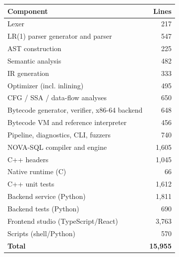 \begin{tabular}{@{}lr@{}}\toprule
\textbf{Component} & \textbf{Lines}\\ \midrule
Lexer & 217\\
LR(1) parser generator and parser & 547\\
AST construction & 225\\
Semantic analysis & 482\\
IR generation & 333\\
Optimizer (incl. inlining) & 495\\
CFG / SSA / data-flow analyses & 650\\
Bytecode generator{,} verifier{,} x86-64 backend & 648\\
Bytecode VM and reference interpreter & 456\\
Pipeline{,} diagnostics{,} CLI{,} fuzzers & 740\\
NOVA-SQL compiler and engine & 1{,}605\\
C++ headers & 1{,}045\\
Native runtime (C) & 66\\
C++ unit tests & 1{,}612\\
Backend service (Python) & 1{,}811\\
Backend tests (Python) & 690\\
Frontend studio (TypeScript/React) & 3{,}763\\
Scripts (shell/Python) & 570\\
\midrule
\textbf{Total} & \textbf{15{,}955}\\ \bottomrule
\end{tabular}
